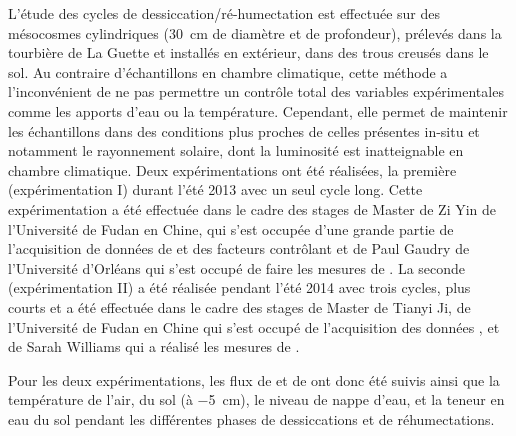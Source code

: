 L'étude des cycles de dessiccation/ré-humectation est effectuée sur des mésocosmes cylindriques (\SI{30}{\centi\metre} de diamètre et de profondeur), prélevés dans la tourbière de La Guette et installés en extérieur, dans des trous creusés dans le sol.
Au contraire d'échantillons en chambre climatique, cette méthode a l'inconvénient de ne pas permettre un contrôle total des variables expérimentales comme les apports d'eau ou la température.
Cependant, elle permet de maintenir les échantillons dans des conditions plus proches de celles présentes in-situ et notamment le rayonnement solaire, dont la luminosité est inatteignable en chambre climatique.
Deux expérimentations ont été réalisées, la première (expérimentation I) durant l'été 2013 avec un seul cycle long.
Cette expérimentation a été effectuée dans le cadre des stages de Master de Zi Yin de l'Université de Fudan en Chine, qui s'est occupée d'une grande partie de l'acquisition de données de \coo et des facteurs contrôlant et de Paul Gaudry de l'Université d'Orléans qui s'est occupé de faire les mesures de \chh.
La seconde (expérimentation II) a été réalisée pendant l'été 2014 avec trois cycles, plus courts et a été effectuée dans le cadre des stages de Master de Tianyi Ji, de l'Université de Fudan en Chine qui s'est occupé de l'acquisition des données \coo, et de Sarah Williams qui a réalisé les mesures de \chh. 

Pour les deux expérimentations, les flux de \coo et de \chh ont donc été suivis ainsi que la température de l'air, du sol (à \SI{-5}{\centi\metre}), le niveau de nappe d'eau, et la teneur en eau du sol pendant les différentes phases de dessiccations et de réhumectations. 


